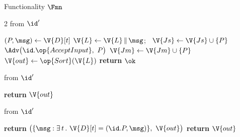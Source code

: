 \begin{interface}[nofloat]{Functionality $\Fmn$ \\
}
{\begin{multicols}{2}
 \quad from $\id'$
\begin{algorithmic}[1]
\algcont
{} \label{ln:mngate}
\State $(P, \msg) \gets \V{D}[t]$
  \State $\V{L} \gets \V{L} \,\|\, \msg$; \ $\V{Js} \gets \V{Js} \cup \{P\}$ \label{ln:mnappend}
  \State $\Adv\bigl(\id.\op{AcceptInput},\ P\bigr)$
\EndIf
\If{$\msg = \none$}
  \State $\V{Jm} \gets \V{Jm} \cup \{P\}$
\EndIf
{}
  \State $\V{out} \gets \op{Sort}(\V{L})$ \label{ln:mnsort}
\EndIf
\State \textbf{return} $\ok$
\algsave
\end{algorithmic}
\vspace{1.4ex}

 \quad from $\id'$
\begin{algorithmic}[1]
\algcont
{} \label{ln:mnnosender}
\State \textbf{return} $\V{out}$
\algsave
\end{algorithmic}
\vspace{1.4ex}

 \quad from $\id'$
\begin{algorithmic}[1]
\algcont
{}
  \State \textbf{return} $\bigl(\{\msg : \exists\, t\, .\ \V{D}[t] = (\id.P, \msg)\},\ \V{out}\bigr)$ \label{ln:mnleaksnd}
\EndIf
\State \textbf{return} $\V{out}$ \label{ln:mnleakout}
\algsave
\end{algorithmic}
\end{multicols}}
\end{interface}
